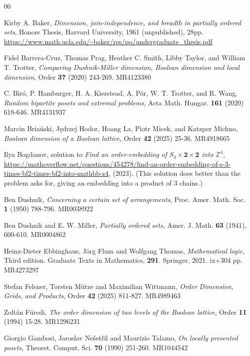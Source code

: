 \documentclass{amsart}
\numberwithin{equation}{section}
\numberwithin{theorem}{section}
\newcommand{\2}{\mathbf{2}}
\begin{document}
\begin{thebibliography}{00}

 Kirby A. Baker,
{\em Dimension, join-independence, and breadth in partially ordered
sets}, Honors Thesis, Harvard University, 1961 (unpublished), 28pp.
\url{https://www.math.ucla.edu/~baker/res/po/undergraduate_thesis.pdf}

 Fidel Barrera-Cruz, Thomas Prag, Heather C. Smith,
Libby Taylor, and William T. Trotter,
{\em Comparing Dushnik-Miller dimension, Boolean
dimension and local dimension}, Order {\bf 37} (2020) 243-269.
MR4123380

 C. Bir\'o, P. Hamburger, H. A. Kierstead, A. P\'or,
W. T. Trotter, and R. Wang,
{\em Random bipartite posets and extremal problems},
Acta Math. Hungar. {\bf 161} (2020) 618-646.
MR4131937

 Marcin Bria\'{n}ski, J\k{e}drzej Hodor,
Hoang La, Piotr Micek, and Katzper Michno,
{\em Boolean dimension of a Boolean lattice,}
Order {\bf 42} (2025) 25-36.
MR4918665

 Ilya Bogdanov, solution to
{\em Find an order-embedding of $S_3\times\2\times\2$
into $\mathbb{Z}^4$},
\url{https://mathoverflow.net/questions/454278/find-an-order-embedding-of-s-3-times-bf2-times-bf2-into-mathbb-z4},
(2023).
(This solution does better than the problem asks for, giving an
embedding into a product of $3$ chains.)

 Ben Dushnik,
{\em Concerning a certain set of arrangements},
Proc. Amer. Math. Soc. {\bf 1} (1950) 788-796.
MR0038922

 Ben Dushnik and E. W. Miller,
{\em Partially ordered sets,}
Amer. J. Math. {\bf 63} (1941), 600-610.
MR0004862

Heinz-Dieter Ebbinghaus, J\"{o}rg Flum and Wolfgang Thomas,
{\em Mathematical logic}, Third edition. Graduate Texts in Mathematics,
{\bf 291}.
Springer, 2021. ix+304 pp.
MR4273297

 Stefan Felsner, Torsten M\"{u}tze and
Maximilian Wittmann,
{\em Order Dimension, Grids, and Products},
Order {\bf 42} (2025) 811-827.
MR4989463

 Zolt\'{a}n F\"{u}redi,
{\em The order dimension of two levels of the Boolean lattice,}
Order {\bf 11} (1994) 15-28.  MR1296231

 Giorgio Gambosi, Jaroslav Ne\v{s}et\v{r}il and Maurizio Talamo,
{\em On locally presented posets,}
Theoret. Comput. Sci. {\bf 70} (1990) 251-260.
MR1044542


\end{thebibliography}
\end{document}
